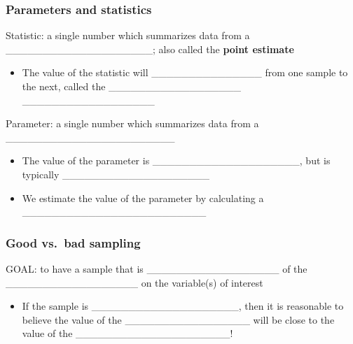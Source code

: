 \documentclass[
]{report}
\providecommand{\tightlist}{%
  \setlength{\itemsep}{0pt}\setlength{\parskip}{0pt}}
\begin{document}

\subsubsection*{Parameters and statistics}\label{parameters-and-statistics}


Statistic: a single number which summarizes data from a \_\_\_\_\_\_\_\_\_\_\_\_\_\_\_\_\_\_\_\_; also called the \textbf{point estimate}

\begin{itemize}
\tightlist
\item
  The value of the statistic will \_\_\_\_\_\_\_\_\_\_\_\_\_\_\_ from one sample to the next, called the \_\_\_\_\_\_\_\_\_\_\_\_\_\_\_\_\_\_ \_\_\_\_\_\_\_\_\_\_\_\_\_\_\_\_\_\_
\end{itemize}

Parameter: a single number which summarizes data from a \_\_\_\_\_\_\_\_\_\_\_\_\_\_\_\_\_\_\_\_\_\_\_

\begin{itemize}
\item
  The value of the parameter is \_\_\_\_\_\_\_\_\_\_\_\_\_\_\_\_\_\_\_\_, but is typically \_\_\_\_\_\_\_\_\_\_\_\_\_\_\_\_\_\_\_\_
\item
  We estimate the value of the parameter by calculating a \_\_\_\_\_\_\_\_\_\_\_\_\_\_\_\_\_\_\_\_\_\_\_\_\_
\end{itemize}

\subsubsection*{Good vs.~bad sampling}\label{good-vs.-bad-sampling}

GOAL: to have a sample that is \_\_\_\_\_\_\_\_\_\_\_\_\_\_\_\_\_\_ of the \_\_\_\_\_\_\_\_\_\_\_\_\_\_\_\_\_\_ on the variable(s) of interest

\begin{itemize}
\tightlist
\item
  If the sample is \_\_\_\_\_\_\_\_\_\_\_\_\_\_\_\_\_\_\_\_, then it is reasonable to believe the value of the \_\_\_\_\_\_\_\_\_\_\_\_\_\_\_\_\_ will be close to the value of the \_\_\_\_\_\_\_\_\_\_\_\_\_\_\_\_\_\_\_\_\_!
\end{itemize}

\end{document}

